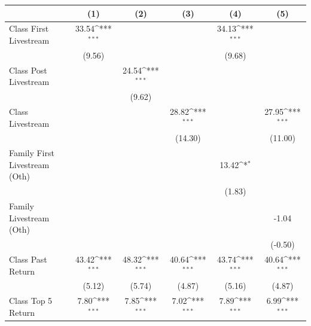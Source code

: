{
\def\sym#1{\ifmmode^{#1}\else\(^{#1}\)\fi}
\begin{tabular}{l*{5}{c}}
\toprule
                    &\multicolumn{1}{c}{(1)}         &\multicolumn{1}{c}{(2)}         &\multicolumn{1}{c}{(3)}         &\multicolumn{1}{c}{(4)}         &\multicolumn{1}{c}{(5)}         \\
\midrule
Class First Livestream&       33.54\sym{***}&                     &                     &       34.13\sym{***}&                     \\
                    &      (9.56)         &                     &                     &      (9.68)         &                     \\
\addlinespace
Class Post Livestream&                     &       24.54\sym{***}&                     &                     &                     \\
                    &                     &      (9.62)         &                     &                     &                     \\
\addlinespace
Class Livestream    &                     &                     &       28.82\sym{***}&                     &       27.95\sym{***}\\
                    &                     &                     &     (14.30)         &                     &     (11.00)         \\
\addlinespace
Family First Livestream (Oth)&                     &                     &                     &       13.42\sym{*}  &                     \\
                    &                     &                     &                     &      (1.83)         &                     \\
\addlinespace
Family Livestream (Oth)&                     &                     &                     &                     &       -1.04         \\
                    &                     &                     &                     &                     &     (-0.50)         \\
\addlinespace
Class Past Return   &       43.42\sym{***}&       48.32\sym{***}&       40.64\sym{***}&       43.74\sym{***}&       40.64\sym{***}\\
                    &      (5.12)         &      (5.74)         &      (4.87)         &      (5.16)         &      (4.87)         \\
\addlinespace
Class Top 5 Return  &        7.80\sym{***}&        7.85\sym{***}&        7.02\sym{***}&        7.89\sym{***}&        6.99\sym{***}\\

\end{tabular}}
